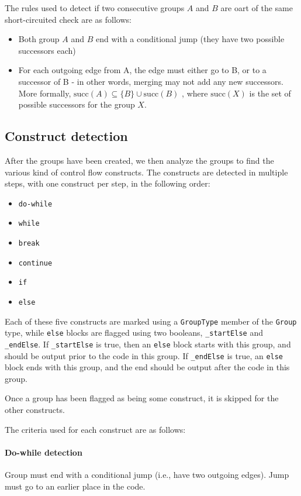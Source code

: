 The rules used to detect if two consecutive groups $A$ and $B$ are oart of the same short-circuited check are as follows:
\begin{itemize}
\item Both group $A$ and $B$ end with a conditional jump (they have two possible successors each)
\item For each outgoing edge from A, the edge must either go to B, or to a successor of B - in other words, merging may not add any new successors. More formally, $\text{succ}(A) \subseteq \{B\} \cup \text{succ}(B)$ , where $\text{succ}(X)$ is the set of possible successors for the group $X$.
\end{itemize}

\subsection{Construct detection}
After the groups have been created, we then analyze the groups to find the various kind of control flow constructs. The constructs are detected in multiple steps, with one construct per step, in the following order:
\begin{itemize}
\item \verb+do-while+
\item \verb+while+
\item \verb+break+
\item \verb+continue+
\item \verb+if+
\item \verb+else+
\end{itemize}

Each of these five constructs are marked using a \verb+GroupType+ member of the \verb+Group+ type, while \verb+else+ blocks are flagged using two booleans, \verb+_startElse+ and \verb+_endElse+. If \verb+_startElse+ is true, then an \verb+else+ block starts with this group, and should be output prior to the code in this group. If \verb+_endElse+ is true, an \verb+else+ block ends with this group, and the end should be output after the code in this group.

Once a group has been flagged as being some construct, it is skipped for the other constructs.

The criteria used for each construct are as follows:

\paragraph{Do-while detection}
Group must end with a conditional jump (i.e., have two outgoing edges). Jump must go to an earlier place in the code.

